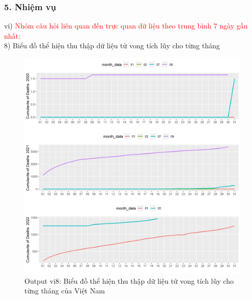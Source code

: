 \documentclass[english,10pt,table]{beamer}
\begin{document}
\begin{frame}[fragile]
\frametitle{5.  Nhiệm vụ}
vi) \textcolor{red}{Nhóm câu hỏi liên quan đến trực quan dữ liệu theo trung bình 7 ngày gần nhất:}\\
    8) Biểu đồ thể hiện thu thập dữ liệu tử vong tích lũy cho từng tháng
	\begin{figure}[h!]
	\begin{center}
		    \includegraphics[scale = 0.26]{Images/VI/vi8 Vietnam .jpeg}
		     \caption{Output vi8: Biểu đồ thể hiện thu thập dữ liệu tử vong tích lũy cho từng tháng của Việt Nam}
		\end{center}
		\end{figure}
\end{frame}
\end{document}

